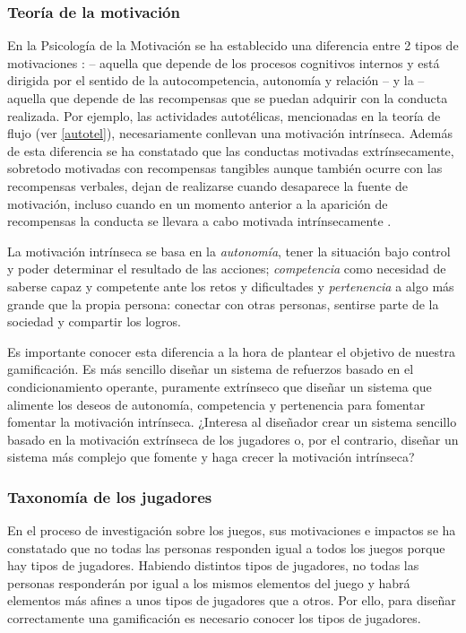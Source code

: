 \subsubsection{Teoría de la motivación}
\label{SDT}
\label{PosiblesPeligros}
En la Psicología de la Motivación se ha establecido una diferencia entre 2 tipos de motivaciones  \citep{SDT}:   -- aquella que depende de los procesos cognitivos internos y está dirigida por el sentido de la autocompetencia, autonomía y relación -- y la  -- aquella que depende de las recompensas que se puedan adquirir con la conducta realizada.
%
Por ejemplo, las actividades autotélicas, mencionadas en la teoría de flujo (ver \ref{autotel}), necesariamente conllevan una motivación intrínseca.
%
Además de esta diferencia se ha constatado que las conductas motivadas extrínsecamente, sobretodo motivadas con recompensas tangibles aunque también ocurre con las recompensas verbales, dejan de realizarse cuando desaparece la fuente de motivación, incluso cuando en un momento anterior a la aparición de recompensas la conducta se llevara a cabo motivada intrínsecamente
%
 \citep{ExtrinsicEatsIntrinsic}.

La motivación intrínseca se basa en la \textit{autonomía}, tener la situación bajo control y poder determinar el resultado de las acciones; \textit{competencia} como necesidad de saberse capaz y competente ante los retos y dificultades y \textit{pertenencia} a algo más grande que la propia persona: conectar con otras personas, sentirse parte de la sociedad y compartir los logros.


Es importante conocer esta diferencia a la hora de plantear el objetivo de nuestra gamificación. 
%
Es más sencillo diseñar un sistema de refuerzos basado en el condicionamiento operante, puramente extrínseco que diseñar un sistema que alimente los deseos de autonomía, competencia y pertenencia para fomentar fomentar la motivación intrínseca.
%
¿Interesa al diseñador crear un sistema sencillo basado en la motivación extrínseca de los jugadores o, por el contrario, diseñar un sistema más complejo que fomente y haga crecer la motivación intrínseca?


\subsubsection{Taxonomía de los jugadores}

%
En el proceso de investigación sobre los juegos, sus motivaciones e impactos se ha constatado que no todas las personas responden igual a todos los juegos porque hay tipos de jugadores. 
%
Habiendo distintos tipos de jugadores, no todas las personas responderán por igual a los mismos elementos del juego y habrá elementos más afines a unos tipos de jugadores que a otros. 
%
Por ello, para diseñar correctamente una gamificación es necesario conocer los tipos de jugadores.


